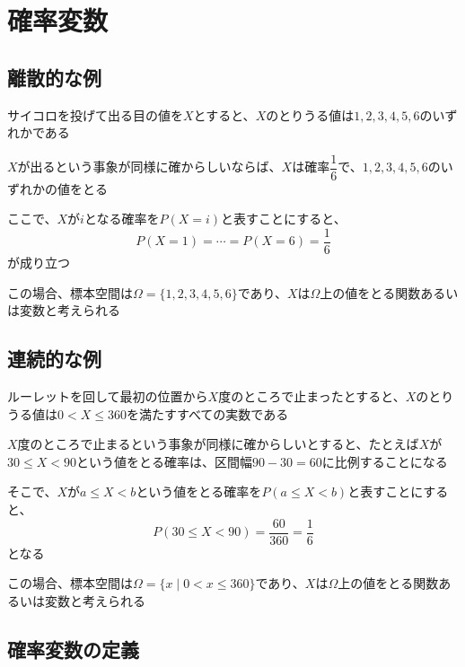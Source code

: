 \documentclass[../../../topic_probability-statistics]{subfiles}
\begin{document}
\sectionline
\section{確率変数}

\subsection{離散的な例}

サイコロを投げて出る目の値を$X$とすると、$X$のとりうる値は$1, 2, 3, 4, 5, 6$のいずれかである

\br

$X$が出るという事象が同様に確からしいならば、$X$は確率$\dfrac{1}{6}$で、$1, 2, 3, 4, 5, 6$のいずれかの値をとる

\br

ここで、$X$が$i$となる確率を$P(X = i)$と表すことにすると、
\begin{equation*}
  P(X = 1) = \cdots = P(X = 6) = \frac{1}{6}
\end{equation*}
が成り立つ

\br

この場合、標本空間は$\Omega = \{1, 2, 3, 4, 5, 6\}$であり、$X$は$\Omega$上の値をとる関数あるいは変数と考えられる

\subsection{連続的な例}

ルーレットを回して最初の位置から$X$度のところで止まったとすると、$X$のとりうる値は$0 < X \leq 360$を満たすすべての実数である

\br

$X$度のところで止まるという事象が同様に確からしいとすると、たとえば$X$が$30 \leq X < 90$という値をとる確率は、区間幅$90 - 30 = 60$に比例することになる

\br

そこで、$X$が$a \leq X < b$という値をとる確率を$P(a \leq X < b)$と表すことにすると、
\begin{equation*}
  P(30 \leq X < 90) = \frac{60}{360} = \frac{1}{6}
\end{equation*}
となる

\br

この場合、標本空間は$\Omega = \{x\mid 0 < x \leq 360\}$であり、$X$は$\Omega$上の値をとる関数あるいは変数と考えられる

\subsection{確率変数の定義}
\end{document}
